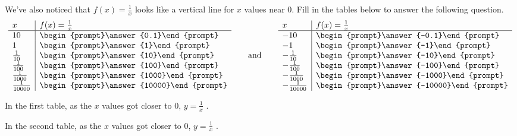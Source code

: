 \documentclass{ximera}
\begin{document}
\begin{problem}
We've also noticed that $f(x) = \frac{1}{x}$ looks like a vertical line for $x$ values near $0$.  Fill in the tables below to answer the following question. 
  \[
  \begin{array}{l|l}
    x      & f(x) = \frac{1}{x}     \\ \hline
    10    & \begin{prompt}\answer{0.1}\end{prompt}\\
    1  & \begin{prompt}\answer{1}\end{prompt}\\
    \frac{1}{10}  & \begin{prompt}\answer{10}\end{prompt}\\
    \frac{1}{100} & \begin{prompt}\answer{100}\end{prompt} \\
    \frac{1}{1000} & \begin{prompt}\answer{1000}\end{prompt} \\
    \frac{1}{10000} & \begin{prompt}\answer{10000}\end{prompt} \\
  \end{array}
  \qquad\text{and}\qquad
  \begin{array}{l|l}
    x      & f(x) = \frac{1}{x}     \\ \hline
    -10    & \begin{prompt}\answer{-0.1}\end{prompt}\\
    -1  & \begin{prompt}\answer{-1}\end{prompt}\\
    -\frac{1}{10}  & \begin{prompt}\answer{-10}\end{prompt}\\
    -\frac{1}{100} & \begin{prompt}\answer{-100}\end{prompt} \\
    -\frac{1}{1000} & \begin{prompt}\answer{-1000}\end{prompt} \\
    -\frac{1}{10000} & \begin{prompt}\answer{-10000}\end{prompt} \\
  \end{array}
  \]
  
In the first table, as the $x$ values got closer to $0$, $y = \frac{1}{x}$ .

In the second table, as the $x$ values got closer to $0$, $y = \frac{1}{x}$ .

\end{problem}


%
\end{document}
